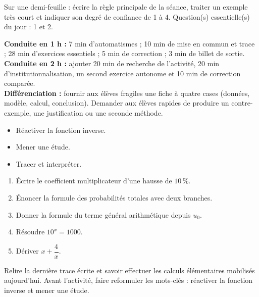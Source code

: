 \begin{sortie}Sur une demi-feuille : écrire la règle principale de la séance, traiter un exemple très court et indiquer son degré de confiance de 1 à 4. Question(s) essentielle(s) du jour : 1 et 2.\end{sortie}

\ifprof
\begin{methode}
\textbf{Conduite en 1 h :} 7 min d'automatismes ; 10 min de mise en commun et trace ; 28 min d'exercices essentiels ; 5 min de correction ; 3 min de billet de sortie.\\
\textbf{Conduite en 2 h :} ajouter 20 min de recherche de l'activité, 20 min d'institutionnalisation, un second exercice autonome et 10 min de correction comparée.\\
\textbf{Différenciation :} fournir aux élèves fragiles une fiche à quatre cases (données, modèle, calcul, conclusion). Demander aux élèves rapides de produire un contre-exemple, une justification ou une seconde méthode.
\end{methode}
\fi
{}
\begin{objectifs}\begin{itemize}\item Réactiver la fonction inverse.\item Mener une étude.\item Tracer et interpréter.\end{itemize}\end{objectifs}
\begin{automatismes}\begin{enumerate}\item Écrire le coefficient multiplicateur d'une hausse de $10\,\%$. \item Énoncer la formule des probabilités totales avec deux branches. \item Donner la formule du terme général arithmétique depuis $u_0$. \item Résoudre $10^x=1000$. \item Dériver $x+\dfrac4x$. \end{enumerate}\end{automatismes}
\begin{prerequis}Relire la dernière trace écrite et savoir effectuer les calculs élémentaires mobilisés aujourd'hui. Avant l'activité, faire reformuler les mots-clés : réactiver la fonction inverse et mener une étude.\end{prerequis}

